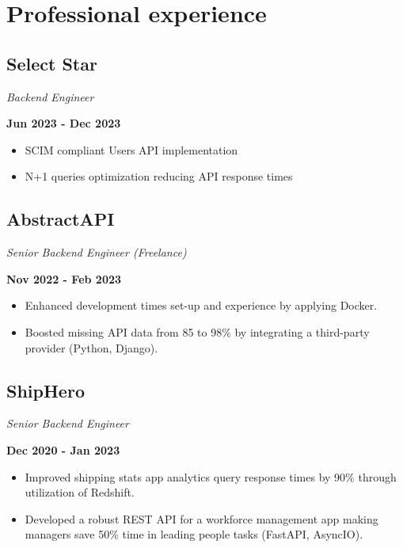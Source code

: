 
\section*{ Professional experience}

\subsection{Select Star}\textit{Backend Engineer}{\textcolor{subsectioncolor}{\textbf{\hfill Jun 2023 - Dec 2023}}
{
  \begin{itemize}[itemsep=-3pt] %
    \item {SCIM compliant Users API implementation}
    \item {N+1 queries optimization reducing API response times}
  \end{itemize}
}

\subsection{AbstractAPI}\textit{Senior Backend Engineer (Freelance)}{\textcolor{subsectioncolor}{\textbf{\hfill Nov 2022 - Feb 2023}}
{
  \begin{itemize}[itemsep=-3pt]
    \item {Enhanced development times set-up and experience by applying Docker.}
    \item {Boosted missing API data from 85 to 98\% by integrating a third-party provider (Python, Django).}
  \end{itemize}
}

\subsection{ShipHero}\textit{Senior Backend Engineer}{\textcolor{subsectioncolor}{\textbf{\hfill Dec 2020 - Jan 2023}}
{
  \begin{itemize}[itemsep=-3pt] %
    \item {Improved shipping stats app analytics query response times by 90\% through utilization of Redshift.}
    \item {Developed a robust REST API for a workforce management app making managers save 50\% time in leading people tasks (FastAPI, AsyncIO).}
  \end{itemize}
}

}}}
